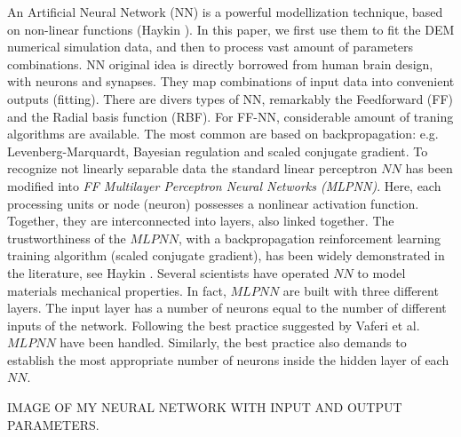An Artificial Neural Network (NN) is a powerful modellization technique, based
on non-linear functions (Haykin \cite{RefWorks:158}). In this paper, we first use them to fit the DEM
numerical simulation data, and then to process vast amount of parameters combinations.
NN original idea is directly borrowed from human brain design, with neurons and
synapses. They map combinations of input data into convenient outputs (fitting).
There are divers types of NN, remarkably the Feedforward (FF) and the Radial
basis function (RBF). For FF-NN, considerable
amount of traning algorithms are available. The most common are based on
backpropagation: e.g. Levenberg-Marquardt, Bayesian regulation and scaled
conjugate gradient. 
To recognize not linearly separable data the standard 
linear perceptron $NN$ has been modified into \textit{FF Multilayer Perceptron
Neural Networks (MLPNN)}. Here, each processing units or node (neuron) possesses a nonlinear activation
function. Together, they are interconnected into layers, also linked together.
The trustworthiness of the $MLPNN$, with a backpropagation
reinforcement learning training algorithm (scaled conjugate gradient), has been widely
demonstrated in the literature, see Haykin \cite{RefWorks:158}.
Several scientists \cite{RefWorks:161, RefWorks:166, RefWorks:167, RefWorks:168, RefWorks:169,
RefWorks:170} have operated $NN$ to model materials mechanical properties.
In fact, $MLPNN$ are built with three different layers.
The input layer has a number of neurons equal to the number of different inputs
of the network. 
Following the best practice suggested by Vaferi et al. \cite{RefWorks:150}
$MLPNN$ have been handled. 
Similarly, the best practice also demands to establish the
most appropriate number of neurons inside the hidden layer of each $NN$.


%


IMAGE OF MY NEURAL NETWORK WITH INPUT AND OUTPUT PARAMETERS. \\
